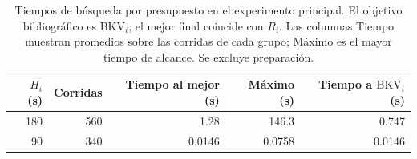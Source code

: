 \begin{table}[tbp]
\centering\small
\caption{Tiempos de búsqueda por presupuesto en el experimento principal. El objetivo bibliográfico es $\mathrm{BKV}_i$; el mejor final coincide con $R_i$. Las columnas Tiempo muestran promedios sobre las corridas de cada grupo; Máximo es el mayor tiempo de alcance. Se excluye preparación.}
\label{tab:timing-cohorts}
\begin{tabular}{rrrrr}
\toprule
$H_i$ (s) & Corridas & Tiempo al mejor (s) & Máximo (s) & Tiempo a $\mathrm{BKV}_i$ (s)\\
\midrule
180 & 560 & 1.28 & 146.3 & 0.747\\
90 & 340 & 0.0146 & 0.0758 & 0.0146\\
\bottomrule\end{tabular}
\end{table}
